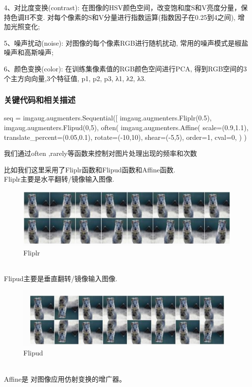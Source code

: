\documentclass[12pt]{report}
\begin{document}
4、对比度变换(contrast): 在图像的HSV颜色空间，改变饱和度S和V亮度分量，保持色调H不变. 对每个像素的S和V分量进行指数运算(指数因子在0.25到4之间), 增加光照变化;

5、噪声扰动(noise): 对图像的每个像素RGB进行随机扰动, 常用的噪声模式是椒盐噪声和高斯噪声;

6、颜色变换(color): 在训练集像素值的RGB颜色空间进行PCA, 得到RGB空间的3个主方向向量,3个特征值, p1, p2, p3, λ1, λ2, λ3.

\subsubsection{关键代码和相关描述}
\begin{python}
seq = imgaug.augmenters.Sequential([
    imgaug.augmenters.Fliplr(0.5),
    imgaug.augmenters.Flipud(0,5),
    often(
        imgaug.augmenters.Affine(
            scale=(0.9,1.1),
            translate_percent=(0.05,0.1),
            rotate=(-10,10),
            shear=(-5,5),
            order=1,
            cval=0,
        )
    )
\end{python}
我们通过often ,rarely等函数来控制对图片处理出现的频率和次数

比如我们这里采用了Fliplr函数和Flipud函数和Affine函数.\\Fliplr主要是水平翻转/镜像输入图像.\\
\begin{figure}[h]
 
  \includegraphics[width=.8\textwidth]{Floplr.png} %
  \caption{Fliplr} %
  \label{img2} %
\end{figure}\\Flipud主要是垂直翻转/镜像输入图像.\\
\begin{figure}[h]
  
  \includegraphics[width=.8\textwidth]{Flipud.png} %
  \caption{Flipud} %
  \label{img2} %
\end{figure}\\Affine是
对图像应用仿射变换的增广器。
\\
\end{document}
